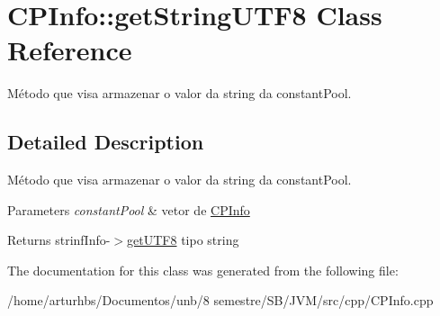 \hypertarget{classCPInfo_1_1getStringUTF8}{}\section{C\+P\+Info\+:\+:get\+String\+U\+T\+F8 Class Reference}
\label{classCPInfo_1_1getStringUTF8}


Método que visa armazenar o valor da string da constant\+Pool.  




\subsection{Detailed Description}
Método que visa armazenar o valor da string da constant\+Pool. 


\begin{DoxyParams}{Parameters}
{\em constant\+Pool} & vetor de \hyperlink{classCPInfo}{C\+P\+Info} \\
\hline
\end{DoxyParams}
\begin{DoxyReturn}{Returns}
strinf\+Info-\/$>$\hyperlink{classCPInfo_1_1getUTF8}{get\+U\+T\+F8} tipo string 
\end{DoxyReturn}


The documentation for this class was generated from the following file\+:\begin{DoxyCompactItemize}
\item 
/home/arturhbs/\+Documentos/unb/8 semestre/\+S\+B/\+J\+V\+M/src/cpp/C\+P\+Info.\+cpp\end{DoxyCompactItemize}
